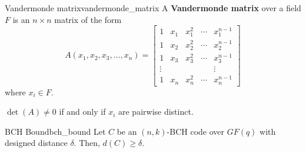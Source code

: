 \begin{Definition}{Vandermonde matrix}{vandermonde_matrix}
    A \textbf{Vandermonde matrix} over a field $ F $ is an
    $ n\times n $ matrix of the form
    \[ A\left(x_{1}, x_{2}, x_{3}, \ldots, x_{n}\right)=\left[\begin{array}{ccccc}
                1      & x_{1} & x_{1}^{2} & \cdots & x_{1}^{n-1} \\
                1      & x_{2} & x_{2}^{2} & \cdots & x_{2}^{n-1} \\
                1      & x_{3} & x_{3}^{2} & \cdots & x_{3}^{n-1} \\
                \vdots &       &           &        & \vdots      \\
                1      & x_{n} & x_{n}^{2} & \cdots & x_{n}^{n-1}
            \end{array}\right] \]
    where $ x_i\in F $.
\end{Definition}

\begin{Theorem}{}{}
    $ \det(A)\neq 0 $ if and only if $ x_i $ are pairwise distinct.
\end{Theorem}

\begin{Theorem}{BCH Bound}{bch_bound}
    Let $ C $ be an $ (n,k) $-BCH code over $ GF(q) $ with designed
    distance $ \delta $. Then, $ d(C)\geqslant \delta $.
\end{Theorem}

